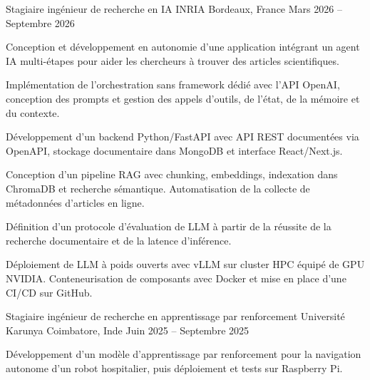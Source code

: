 
\begin{cventries}
  \cventry
    {Stagiaire ingénieur de recherche en IA}
    {INRIA}
    {Bordeaux, France}
    {Mars 2026 -- Septembre 2026}
    {
      \begin{cvitems}
        \item {Conception et développement en autonomie d’une application intégrant un agent IA multi-étapes pour aider les chercheurs à trouver des articles scientifiques.}
        \item {Implémentation de l’orchestration sans framework dédié avec l’API OpenAI, conception des prompts et gestion des appels d’outils, de l’état, de la mémoire et du contexte.}
        \item {Développement d’un backend Python/FastAPI avec API REST documentées via OpenAPI, stockage documentaire dans MongoDB et interface React/Next.js.}
        \item {Conception d’un pipeline RAG avec chunking, embeddings, indexation dans ChromaDB et recherche sémantique. Automatisation de la collecte de métadonnées d’articles en ligne.}
        \item {Définition d’un protocole d’évaluation de LLM à partir de la réussite de la recherche documentaire et de la latence d’inférence.}
        \item {Déploiement de LLM à poids ouverts avec vLLM sur cluster HPC équipé de GPU NVIDIA. Conteneurisation de composants avec Docker et mise en place d’une CI/CD sur GitHub.}
      \end{cvitems}
    }

  \cventry
    {Stagiaire ingénieur de recherche en apprentissage par renforcement}
    {Université Karunya}
    {Coimbatore, Inde}
    {Juin 2025 -- Septembre 2025}
    {
      \begin{cvitems}
        \item {Développement d’un modèle d’apprentissage par renforcement pour la navigation autonome d’un robot hospitalier, puis déploiement et tests sur Raspberry Pi.}
      \end{cvitems}
    }
\end{cventries}
